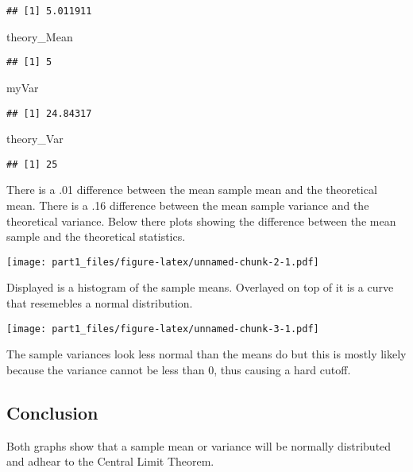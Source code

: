 \documentclass[]{article}
\newenvironment{Shaded}{\begin{snugshade}}{\end{snugshade}}
\newcommand{\NormalTok}[1]{#1}
\begin{document}
\begin{verbatim}
## [1] 5.011911
\end{verbatim}

\begin{Shaded}
\begin{Highlighting}[]
\NormalTok{theory_Mean}
\end{Highlighting}
\end{Shaded}

\begin{verbatim}
## [1] 5
\end{verbatim}

\begin{Shaded}
\begin{Highlighting}[]
\NormalTok{myVar}
\end{Highlighting}
\end{Shaded}

\begin{verbatim}
## [1] 24.84317
\end{verbatim}

\begin{Shaded}
\begin{Highlighting}[]
\NormalTok{theory_Var}
\end{Highlighting}
\end{Shaded}

\begin{verbatim}
## [1] 25
\end{verbatim}

There is a .01 difference between the mean sample mean and the
theoretical mean. There is a .16 difference between the mean sample
variance and the theoretical variance. Below there plots showing the
difference between the mean sample and the theoretical statistics.

\texttt{[image: part1\_files/figure-latex/unnamed-chunk-2-1.pdf]}

Displayed is a histogram of the sample means. Overlayed on top of it is
a curve that resemebles a normal distribution.

\texttt{[image: part1\_files/figure-latex/unnamed-chunk-3-1.pdf]}

The sample variances look less normal than the means do but this is
mostly likely because the variance cannot be less than 0, thus causing a
hard cutoff.

\subsection{Conclusion}\label{conclusion}

Both graphs show that a sample mean or variance will be normally
distributed and adhear to the Central Limit Theorem.
\end{document}
